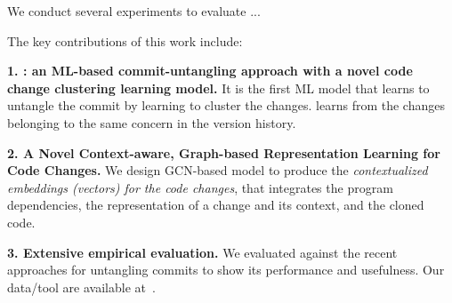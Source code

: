 
We conduct several experiments to evaluate {\tool}...

The key contributions of this work include:

{\bf 1. {\tool}: an ML-based commit-untangling approach with a novel
  code change clustering learning model.} It is the first ML model
that learns to untangle the commit by learning to cluster the changes.
{\tool} learns from the changes belonging to the same concern in the
version history.

{\bf 2. A Novel Context-aware, Graph-based Representation Learning for
  Code Changes.} We design GCN-based model to produce the {\em
  contextualized embeddings (vectors) for the code changes}, that
integrates the program dependencies, the representation of a change
and its context, and the cloned code.

{\bf 3. Extensive empirical evaluation.} We evaluated {\tool} against
the recent approaches for untangling commits to show its performance
and usefulness. Our data/tool are available at~\cite{utango-website}.
